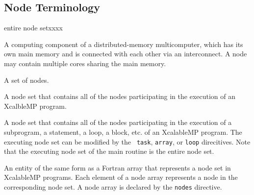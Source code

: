 \subsection{Node Terminology}

\begin{namelist}{entire node setxxxx}


 A computing component of a distributed-memory multicomputer, which has
 its own main memory and is connected with each other via an
 interconnect. A node may contain multiple cores sharing the main
 memory.



 A set of nodes.


 A node set that contains all of the nodes participating in the
 execution of an XcalbleMP program.


 A node set that contains all of the nodes participating in the
 execution of a subprogram, a statement, a loop, a block, etc. of an
 XcalableMP program. The executing node set can be modified by the {\tt
 task}, {\tt array}, or {\tt loop} direcitives. Note that the executing
 node set of the main routine is the entire node set.


 An entity of the same form as a Fortran array that represents a node
 set in XcalableMP programs. Each element of a node array represents a
 node in the corresponding node set. A node array is declared by the
 {\tt nodes} directive.

%


\end{namelist}
